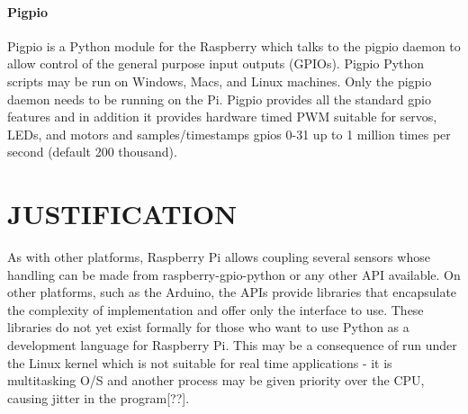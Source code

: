 \documentclass{acm_proc_article-sp}
\begin{document}
\paragraph{Pigpio}
Pigpio is a Python module for the Raspberry which talks to the pigpio daemon to allow control of the general purpose input outputs (GPIOs). Pigpio Python scripts may be run on Windows, Macs, and Linux machines. Only the pigpio daemon needs to be running on the Pi.
\newline
\newline
Pigpio provides all the standard gpio features and in addition it provides hardware timed PWM suitable for servos, LEDs, and motors and samples/timestamps gpios 0-31 up to 1 million times per second (default 200 thousand).

\section{JUSTIFICATION}
As with other platforms, Raspberry Pi allows coupling several sensors whose handling can be made from raspberry-gpio-python or any other API available. On other platforms, such as the Arduino, the APIs provide libraries that encapsulate the complexity of implementation and offer only the interface to use. These libraries do not yet exist formally for those who want to use Python as a development language for Raspberry Pi.
\newline
\newline
This may be a consequence of run under the Linux kernel which is not suitable for real time applications - it is multitasking O/S and another process may be given priority over the CPU, causing jitter in the program[??].
\end{document}
